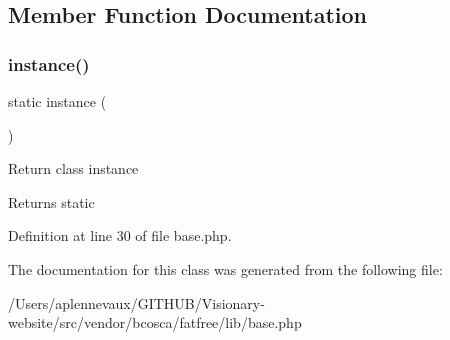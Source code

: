 \subsection{Member Function Documentation}
\hypertarget{class_prefab_a0deb004950b8dc4f51836316fd19c111}{}\label{class_prefab_a0deb004950b8dc4f51836316fd19c111} 
\subsubsection{\texorpdfstring{instance()}{instance()}}
{\footnotesize\ttfamily static instance (\begin{DoxyParamCaption}{ }\end{DoxyParamCaption})\hspace{0.3cm}{\ttfamily [static]}}

Return class instance \begin{DoxyReturn}{Returns}
static 
\end{DoxyReturn}


Definition at line 30 of file base.\+php.



The documentation for this class was generated from the following file\+:\begin{DoxyCompactItemize}
\item 
/\+Users/aplennevaux/\+G\+I\+T\+H\+U\+B/\+Visionary-\/website/src/vendor/bcosca/fatfree/lib/base.\+php\end{DoxyCompactItemize}
